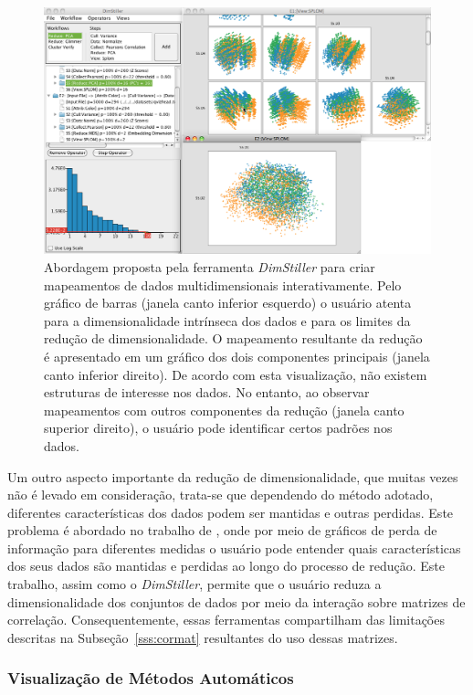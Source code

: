 \begin{figure}[h!]
    \centering
    \includegraphics[width=16cm]{images/ds.png}
    \caption[DimStiller]{Abordagem proposta pela ferramenta
    \emph{DimStiller} para criar mapeamentos de dados
multidimensionais interativamente. Pelo gráfico de barras
(janela canto inferior esquerdo) o usuário atenta para a
dimensionalidade intrínseca dos dados e para os limites da
redução de dimensionalidade. O mapeamento resultante da
redução é apresentado em um gráfico dos dois componentes
principais (janela canto inferior direito). De acordo com
esta visualização, não existem estruturas de interesse nos
dados. No entanto, ao observar mapeamentos com outros
componentes da redução (janela canto superior direito), o
usuário pode identificar certos padrões nos dados.}
    \label{fig:ds}
\end{figure}

Um outro aspecto importante da redução de dimensionalidade,
que muitas vezes não é levado em consideração, trata-se que
dependendo do método adotado, diferentes características dos
dados podem ser mantidas e outras perdidas. Este problema é
abordado no trabalho de \cite{Johansson2009}, onde por meio
de gráficos de perda de informação para diferentes medidas o
usuário pode entender quais características dos seus dados
são mantidas e perdidas ao longo do processo de redução.
Este trabalho, assim como o \emph{DimStiller}, permite que o
usuário reduza a dimensionalidade dos conjuntos de dados por
meio da interação sobre matrizes de correlação.
Consequentemente, essas ferramentas compartilham das
limitações descritas na Subseção~\ref{sss:cormat}
resultantes do uso dessas matrizes.

\subsubsection{Visualização de Métodos Automáticos}

